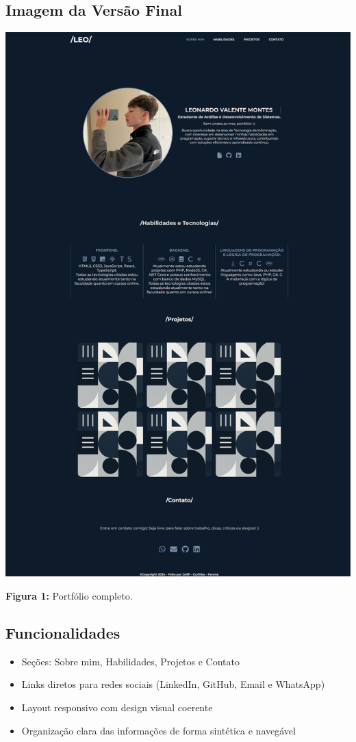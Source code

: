 \documentclass[12pt]{article}
\begin{document}
\subsection*{Imagem da Versão Final}

\begin{center}
\includegraphics[width=14cm]{imagem.png}

\textbf{Figura 1:} Portfólio completo.
\end{center}
\subsection*{Funcionalidades}

\begin{itemize}
    \item Seções: Sobre mim, Habilidades, Projetos e Contato
    \item Links diretos para redes sociais (LinkedIn, GitHub, Email e WhatsApp)
    \item Layout responsivo com design visual coerente
    \item Organização clara das informações de forma sintética e navegável
\end{itemize}
\end{document}
